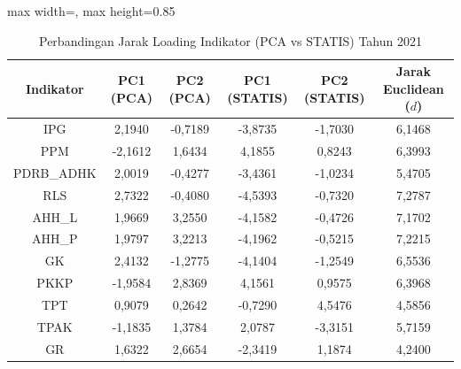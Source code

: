 \begin{table}[H]
\centering
\caption{Perbandingan Jarak Loading Indikator (PCA vs STATIS) Tahun 2021} \label{tab:app2jarak_loading_2021}
\begin{adjustbox}{max width=\textwidth, max height=0.85\textheight}
\begin{tabular}{|c|c|c|c|c|c|}
\hline
\textbf{Indikator} & \textbf{PC1 (PCA)} & \textbf{PC2 (PCA)} & \textbf{PC1 (STATIS)} & \textbf{PC2 (STATIS)} & \textbf{Jarak Euclidean ($d$)} \\
\hline
IPG & 2,1940 & -0,7189 & -3,8735 & -1,7030 & 6,1468 \\
PPM & -2,1612 & 1,6434 & 4,1855 & 0,8243 & 6,3993 \\
PDRB\_ADHK & 2,0019 & -0,4277 & -3,4361 & -1,0234 & 5,4705 \\
RLS & 2,7322 & -0,4080 & -4,5393 & -0,7320 & 7,2787 \\
AHH\_L & 1,9669 & 3,2550 & -4,1582 & -0,4726 & 7,1702 \\
AHH\_P & 1,9797 & 3,2213 & -4,1962 & -0,5215 & 7,2215 \\
GK & 2,4132 & -1,2775 & -4,1404 & -1,2549 & 6,5536 \\
PKKP & -1,9584 & 2,8369 & 4,1561 & 0,9575 & 6,3968 \\
TPT & 0,9079 & 0,2642 & -0,7290 & 4,5476 & 4,5856 \\
TPAK & -1,1835 & 1,3784 & 2,0787 & -3,3151 & 5,7159 \\
GR & 1,6322 & 2,6654 & -2,3419 & 1,1874 & 4,2400 \\
\hline
\end{tabular}
\end{adjustbox}
\end{table}